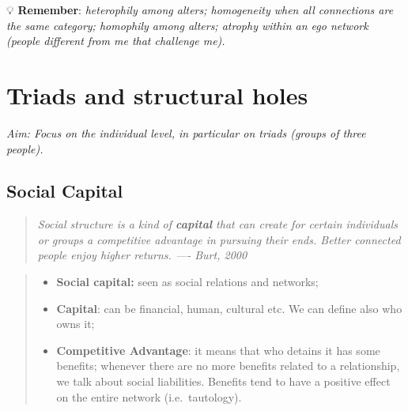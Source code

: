 \documentclass[
  notitlepage,
  onecolumn,
  openany]{book}
\providecommand{\tightlist}{%
  \setlength{\itemsep}{0pt}\setlength{\parskip}{0pt}}
\begin{document}
💡 \textbf{Remember}:
\emph{heterophily among alters;
homogeneity when all connections are the same category;
homophily among alters;
atrophy within an ego network (people different from me that challenge me).}

\hypertarget{triads-and-structural-holes}{%
\chapter{Triads and structural holes}\label{triads-and-structural-holes}}

\emph{Aim: Focus on the individual level, in particular on triads (groups of three people).}

\hypertarget{social-capital}{%
\section{Social Capital}\label{social-capital}}

\begin{quote}
\emph{Social structure is a kind of \textbf{capital} that can create for certain individuals or groups a competitive advantage in pursuing their ends. Better connected people enjoy higher returns.
---- Burt, 2000}
\end{quote}

\begin{quote}
\begin{itemize}
\tightlist
\item
  \textbf{Social capital:} seen as social relations and networks;
\item
  \textbf{Capital}: can be financial, human, cultural etc. We can define also who owns it;
\item
  \textbf{Competitive Advantage}: it means that who detains it has some benefits; whenever there are no more benefits related to a relationship, we talk about social liabilities. Benefits tend to have a positive effect on the entire network (i.e.~tautology).
\end{itemize}
\end{quote}
\end{document}
